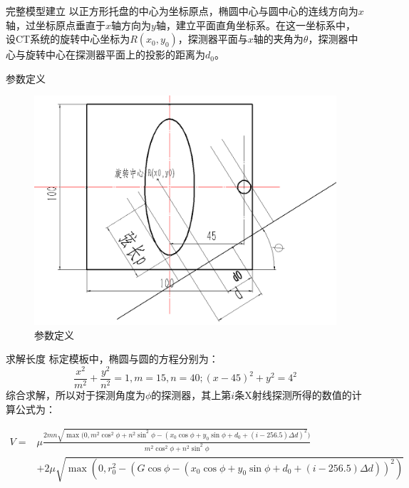 \documentclass{beamer}
\begin{document}
\begin{frame}{完整模型建立}
	以正方形托盘的中心为坐标原点，椭圆中心与圆中心的连线方向为\(x\)轴，过坐标原点垂直于\(x\)轴方向为\(y\)轴，建立平面直角坐标系。在这一坐标系中，设CT系统的旋转中心坐标为\(R(x_0,y_0)\)，探测器平面与\(x\)轴的夹角为\(\theta\)，探测器中心与旋转中心在探测器平面上的投影的距离为\(d_0\)。
	  
\end{frame}



\begin{frame}{参数定义}
	\begin{figure}
		\begin{center}
			\includegraphics[scale=0.3]{pic/q13.png}
		\end{center}
		\caption{参数定义}
		\label{Fig:xian}
	\end{figure}
\end{frame}



\begin{frame}{求解长度}
	标定模板中，椭圆与圆的方程分别为：
	\[\frac{x^2}{m^2} + \frac{y^2}{n^2} = 1,m = 15,n = 40;(x - 45)^2 + y^2 = 4^2\]
	综合求解，所以对于探测角度为\(\phi\)的探测器，其上第\(i\)条X射线探测所得的数值的计算公式为：
	\begin{tiny}
		\begin{align*}\label{va}
			V = & \mu\frac{2mn\sqrt{\max(0,m^2\cos^2\phi + n^2\sin^2\phi - (x_0\cos\phi + y_0\sin\phi + d_0 +  (i - 256.5)\Delta d)^2})}{ m^2\cos^2\phi + n^2\sin^2\phi} \\
			    & + 2\mu\sqrt{\max(0,r_0^2 - (G\cos\phi - (x_0\cos\phi + y_0\sin\phi + d_0 +  (i - 256.5)\Delta d))^2)}                                                  
		\end{align*}
	\end{tiny}
\end{frame}
\end{document}
